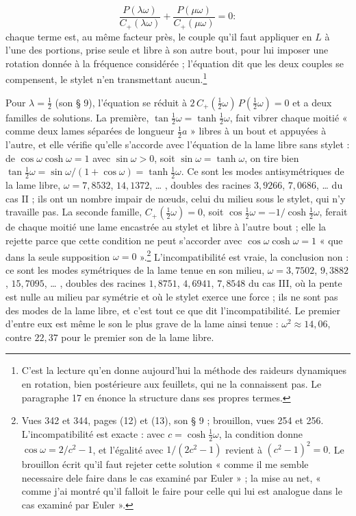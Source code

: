\documentclass[11pt,a4paper]{article}
\begin{document}
\[
\frac{P(\lambda\omega)}{C_{+}(\lambda\omega)}+\frac{P(\mu\omega)}{C_{+}(\mu\omega)}=0 :
\]
chaque terme est, au même facteur près, le couple qu'il faut appliquer en $L$ à l'une des portions, prise seule et libre à son autre bout, pour lui imposer une rotation donnée à la fréquence considérée ; l'équation dit que les deux couples se compensent, le stylet n'en transmettant aucun.\footnote{C'est la lecture qu'en donne aujourd'hui la méthode des raideurs dynamiques en rotation, bien postérieure aux feuillets, qui ne la connaissent pas. Le paragraphe 17 en énonce la structure dans ses propres termes.}

Pour $\lambda=\frac12$ (son § 9), l'équation se réduit à $2\,C_{+}(\tfrac12\omega)\,P(\tfrac12\omega)=0$ et a deux familles de solutions. La première, $\tan\frac12\omega=\tanh\frac12\omega$, fait vibrer chaque moitié « comme deux lames séparées de longueur $\frac12a$ » libres à un bout et appuyées à l'autre, et elle vérifie qu'elle s'accorde avec l'équation de la lame libre sans stylet : de $\cos\omega\cosh\omega=1$ avec $\sin\omega>0$, soit $\sin\omega=\tanh\omega$, on tire bien $\tan\frac12\omega=\sin\omega/(1+\cos\omega)=\tanh\frac12\omega$. Ce sont les modes antisymétriques de la lame libre, $\omega=7{,}8532$, $14{,}1372$, … , doubles des racines $3{,}9266$, $7{,}0686$, … du cas II ; ils ont un nombre impair de nœuds, celui du milieu sous le stylet, qui n'y travaille pas. La seconde famille, $C_{+}(\frac12\omega)=0$, soit $\cos\frac12\omega=-1/\cosh\frac12\omega$, ferait de chaque moitié une lame encastrée au stylet et libre à l'autre bout ; elle la rejette parce que cette condition ne peut s'accorder avec $\cos\omega\cosh\omega=1$ « que dans la seule supposition $\omega=0$ ».\footnote{Vues 342 et 344, pages (12) et (13), son § 9 ; brouillon, vues 254 et 256. L'incompatibilité est exacte : avec $c=\cosh\frac12\omega$, la condition donne $\cos\omega=2/c^2-1$, et l'égalité avec $1/(2c^2-1)$ revient à $(c^2-1)^2=0$. Le brouillon écrit qu'il faut rejeter cette solution « comme il me semble necessaire dele faire dans le cas examiné par Euler » ; la mise au net, « comme j'ai montré qu'il falloit le faire pour celle qui lui est analogue dans le cas examiné par Euler ».} L'incompatibilité est vraie, la conclusion non : ce sont les modes symétriques de la lame tenue en son milieu, $\omega=3{,}7502$, $9{,}3882$, $15{,}7095$, … , doubles des racines $1{,}8751$, $4{,}6941$, $7{,}8548$ du cas III, où la pente est nulle au milieu par symétrie et où le stylet exerce une force ; ils ne sont pas des modes de la lame libre, et c'est tout ce que dit l'incompatibilité. Le premier d'entre eux est même le son le plus grave de la lame ainsi tenue : $\omega^2\approx14{,}06$, contre $22{,}37$ pour le premier son de la lame libre.
\end{document}
